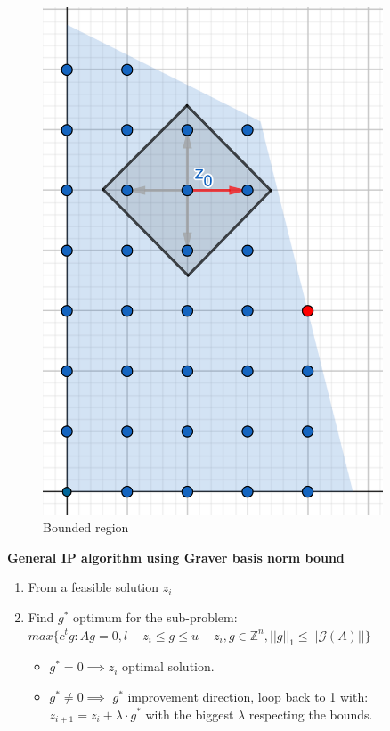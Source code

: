 \begin{figure}[h]
\begin{minipage}[b]{0.45\textwidth}
    \includegraphics[width=0.9\textwidth]{images/IP.png}
    \caption{Bounded region}
\end{minipage}
\end{figure}

\newpage
\textbf{General IP algorithm using Graver basis norm bound}
\vspace{-8pt}
\begin{enumerate}
    \item From a feasible solution $z_i$
    \item Find $g^*$ optimum for the sub-problem: \vspace{4pt}\\
          $max\{c^tg : Ag = 0, l-z_i \leq g \leq u-z_i, g \in \mathbb{Z}^n, ||g||_1 \leq ||\mathcal{G}(A)|| \}$ \vspace{4pt}
    \begin{itemize}
        \item $g^* = 0 \implies z_i$ optimal solution.
        \item $g^* \neq 0 \implies$ $g^*$ improvement direction, loop back to 1 with:\\
        $z_{i+1} = z_i + \lambda \cdot g^*$ with the biggest $\lambda$ respecting the bounds.
    \end{itemize}
\end{enumerate}

